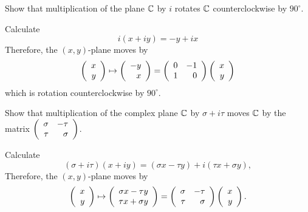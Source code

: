 \documentclass{ximera}
\begin{document}
\begin{exercise}\label{YZ_6.2_CplxMult1}
Show that multiplication of the plane $\C$ by $i$ rotates $\C$ counterclockwise by $90^\circ$. 

\begin{solution}
\soln
Calculate
\[
i (x+iy) = -y +ix
\]
Therefore, the $(x,y)$-plane moves by 
\[
 \Matrix{x\\y} \mapsto \Matrix{-y\\x} = \Matrix{ 0 & -1 \\ 1 & 0 } \Matrix{x\\y}
\]
which is rotation counterclockwise by $90^\circ$.
\end{solution}
\end{exercise}


\begin{exercise} \label{YZ_6.2_CplxMult2}
Show that multiplication of the complex plane $\C$ by $\sigma+i\tau$ moves $\C$ 
by the matrix $\Matrix{\sigma&-\tau\\ \tau&\sigma}$.

\begin{solution}
\soln
Calculate
\[
(\sigma+i\tau) (x+iy) = (\sigma x - \tau y)+i(\tau x + \sigma y),
\]
Therefore, the $(x,y)$-plane moves by
\[
 \Matrix{x\\y} \mapsto \Matrix{\sigma x - \tau y \\ \tau x + \sigma y} = 
 \Matrix{ \sigma & -\tau \\ \tau & \sigma } \Matrix{x\\y}.
\]
\end{solution}

\end{exercise}
\end{document}
